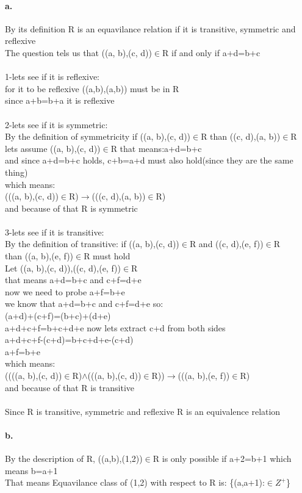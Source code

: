 \documentclass[11pt]{article}
\begin{document}
\paragraph{a.}
By its definition R is an equavilance relation if it is transitive, symmetric and reflexive\\
The question tels us that ((a, b),(c, d))$\in$R if and
only if a+d=b+c\\
\\
1-lets see if it is reflexive:\\
for it to be reflexive ((a,b),(a,b)) must be in R\\
since a+b=b+a it is reflexive\\
\\
2-lets see if it is symmetric:\\
By the definition of symmetricity if ((a, b),(c, d))$\in$R than ((c, d),(a, b))$\in$R\\
lets assume ((a, b),(c, d))$\in$R that means:a+d=b+c\\
and since a+d=b+c holds, c+b=a+d must also hold(since they are the same thing)\\
which means:\\
(((a, b),(c, d))$\in$R)$\rightarrow$(((c, d),(a, b))$\in$R)\\
and because of that R is symmetric\\
\\
3-lets see if it is transitive:\\
By the definition of transitive: 
if ((a, b),(c, d))$\in$R and ((c, d),(e, f))$\in$R\\
than ((a, b),(e, f))$\in$R must hold\\
Let ((a, b),(c, d)),((c, d),(e, f))$\in$R\\
that means a+d=b+c and c+f=d+e\\
now we need to probe a+f=b+e\\
we know that a+d=b+c and c+f=d+e so:\\
(a+d)+(c+f)=(b+c)+(d+e)\\
a+d+c+f=b+c+d+e now lets extract c+d from both sides\\
a+d+c+f-(c+d)=b+c+d+e-(c+d)\\
a+f=b+e\\
which means:\\
((((a, b),(c, d))$\in$R)$\land$(((a, b),(c, d))$\in$R))$\rightarrow$(((a, b),(e, f))$\in$R)\\

and because of that R is transitive\\
\\
Since R is transitive, symmetric and reflexive R is an equivalence relation

\paragraph{b.}
By the description of R, ((a,b),(1,2))$\in$R is only possible if a+2=b+1 which means b=a+1\\
That means Equavilance class of (1,2) with respect to R is: \{(a,a+1):$\in Z^{+}$\}\\
\end{document}

